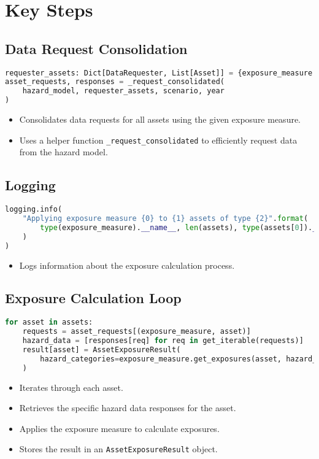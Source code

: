 \documentclass{article}
\begin{document}
\section{Key Steps}

\subsection{Data Request Consolidation}
\begin{lstlisting}[language=Python]
requester_assets: Dict[DataRequester, List[Asset]] = {exposure_measure: assets}
asset_requests, responses = _request_consolidated(
    hazard_model, requester_assets, scenario, year
)
\end{lstlisting}
\begin{itemize}
    \item Consolidates data requests for all assets using the given exposure measure.
    \item Uses a helper function \texttt{\_request\_consolidated} to efficiently request data from the hazard model.
\end{itemize}

\subsection{Logging}
\begin{lstlisting}[language=Python]
logging.info(
    "Applying exposure measure {0} to {1} assets of type {2}".format(
        type(exposure_measure).__name__, len(assets), type(assets[0]).__name__
    )
)
\end{lstlisting}
\begin{itemize}
    \item Logs information about the exposure calculation process.
\end{itemize}

\subsection{Exposure Calculation Loop}
\begin{lstlisting}[language=Python]
for asset in assets:
    requests = asset_requests[(exposure_measure, asset)]
    hazard_data = [responses[req] for req in get_iterable(requests)]
    result[asset] = AssetExposureResult(
        hazard_categories=exposure_measure.get_exposures(asset, hazard_data)
    )
\end{lstlisting}
\begin{itemize}
    \item Iterates through each asset.
    \item Retrieves the specific hazard data responses for the asset.
    \item Applies the exposure measure to calculate exposures.
    \item Stores the result in an \texttt{AssetExposureResult} object.
\end{itemize}
\end{document}
